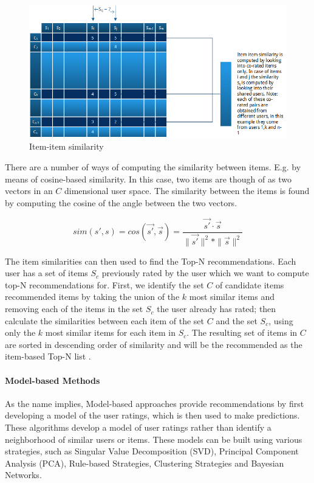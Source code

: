\begin{figure}[H]
    \includegraphics[width=5in]{image/itemsim.png}
    \centering
    \caption[Item-item similarity]{Item-item similarity}
    \label{figure:itemsim}
\end{figure}

There are a number of ways of computing the similarity between items. E.g. by
means of cosine-based similarity. In this case, two items are though of as two
vectors in an $C$ dimensional user space. The similarity between the items is
found by computing the cosine of the angle between the two vectors.

\begin{equation}
sim(s',s) = cos(\vec{s'},\vec{s}) = \frac{\vec{s'} \cdot \vec{s}}{\|\vec{s'}\|^{2} * \|\vec{s}\|^{2}}
\end{equation}

The item similarities can then used to find the Top-N recommendations. Each
user has a set of items $S_{c}$ previously rated by the user which we want to
compute top-N recommendations for. First, we identify the set $C$ of candidate
items recommended items by taking the union of the $k$ most similar items and
removing each of the items in the set $S_{c}$ the user already has rated; then
calculate the similarities between each item of the set $C$ and the set
$S_{c}$, using only the $k$ most similar items for each item in $S_{c}$. The
resulting set of items in $C$ are sorted in descending order of similarity and
will be the recommended as the item-based Top-N list \cite{Karypis2001}.

\paragraph{Model-based Methods}


As the name implies, Model-based approaches provide recommendations by first
developing a model of the user ratings, which is then used to make predictions.
These algorithms develop a model of user ratings rather than identify a
neighborhood of similar users or items. These models can be built using various
strategies, such as Singular Value Decomposition (SVD), Principal Component
Analysis (PCA), Rule-based Strategies, Clustering Strategies and Bayesian
Networks.

